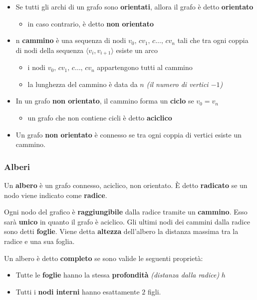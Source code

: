 \documentclass[italian, 10pt]{article}
\begin{document}
\begin{itemize}
  \item Se tutti gli archi di un grafo sono \textbf{orientati}, allora il grafo è detto \textbf{orientato}
        \begin{itemize}
          \item in caso contrario, è detto \textbf{non orientato}
        \end{itemize}
  \item n \textbf{cammino} è una sequenza di nodi \(v_0,\,c v_1,\,c \ldots,\,c v_n\) tali che tra ogni coppia di nodi della sequenza \(\langle v_i, v_{i+1} \rangle\) esiste un arco
        \begin{itemize}
          \item i nodi \(v_0,\,c v_1,\,c \ldots,\,c v_n\) appartengono tutti al cammino
          \item la lunghezza del cammino è data da \(n\) \textit{(il numero di vertici \(-1\))}
        \end{itemize}
  \item In un grafo \textbf{non orientato}, il cammino forma un \textbf{ciclo} se \(v_0 = v_n\)
        \begin{itemize}
          \item un grafo che non contiene cicli è detto \textbf{aciclico}
        \end{itemize}
  \item Un grafo \textbf{non orientato} è connesso se tra ogni coppia di vertici esiste un cammino.
\end{itemize}

\subsubsection{Alberi}
\label{sec:alberi}

Un \textbf{albero} è un grafo connesso, aciclico, non orientato.
È detto \textbf{radicato} se un nodo viene indicato come \textbf{radice}.

Ogni nodo del grafico è \textbf{raggiungibile} dalla radice tramite un \textbf{cammino}.
Esso sarà \textbf{unico} in quanto il grafo è aciclico.
Gli ultimi nodi dei cammini dalla radice sono detti \textbf{foglie}.
Viene detta \textbf{altezza} dell'albero la distanza massima tra la radice e una sua foglia.

Un albero è detto \textbf{completo} se sono valide le seguenti proprietà:

\begin{itemize}
  \item Tutte le \textbf{foglie} hanno la stessa \textbf{profondità} \textit{(distanza dalla radice)} \(h\)
  \item Tutti i \textbf{nodi interni} hanno esattamente \(2\) figli.
\end{itemize}
\end{document}
